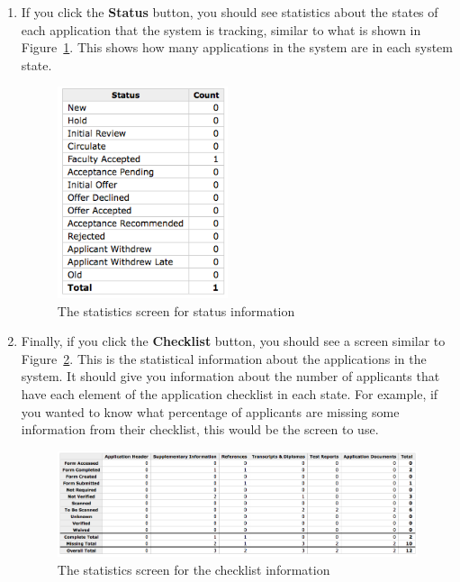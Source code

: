 \documentclass[titlepage]{article}
\begin{document}
\begin{enumerate}
\item If you click the \textbf{\textsf{Status}} button, you should see statistics about the states of each application that the system is tracking, similar to what is shown in Figure~\ref{tStats3}. This shows how many applications in the system are in each system state.

\begin{figure}[h!]
  \begin{center}
  \includegraphics[width=5cm]{stats3.png}
  \end{center}
  \caption{The statistics screen for status information}
  \label{tStats3}
\end{figure}

\item Finally, if you click the \textbf{\textsf{Checklist}} button, you should see a screen similar to Figure~\ref{tStats4}. This is the statistical information about the applications in the system. It should give you information about the number of applicants that have each element of the application checklist in each state. For example, if you wanted to know what percentage of applicants are missing some information from their checklist, this would be the screen to use.

\begin{figure}[h!]
  \begin{center}
  \includegraphics[width=16cm]{stats4.png}
  \end{center}
  \caption{The statistics screen for the checklist information}
  \label{tStats4}
\end{figure}

\end{enumerate}
\end{document}
